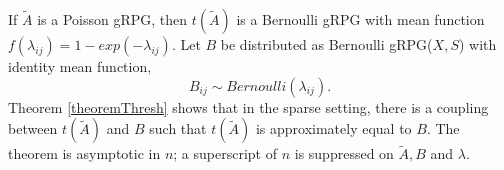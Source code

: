 \documentclass[twoside,11pt]{article}
\begin{document}
If $\tilde A$ is a Poisson gRPG, then $t(\tilde A)$ is a Bernoulli gRPG with mean function $f(\lambda_{ij}) = 1-exp(-\lambda_{ij})$.  
%
%
Let   $B$ be distributed as Bernoulli gRPG($X,S$) with identity mean function, $$B_{ij} \sim Bernoulli(\lambda_{ij}).$$  Theorem \ref{theoremThresh} shows that in the sparse setting, there is a coupling between $t(\tilde A)$ and $B$ such that $t(\tilde A)$ is approximately equal to $B$.  The theorem is asymptotic in $n$; a superscript of $n$ is suppressed on $\tilde A, B$ and $\lambda$. 



\end{document}
